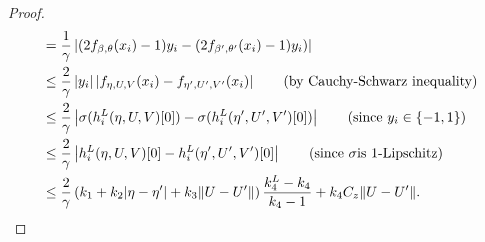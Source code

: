 \begin{proof}
\begin{align*}
        &= \frac{1}{\gamma}\left|(2f_{\beta, \theta}(x_i) - 1) y_i-(2f_{\beta^\prime, \theta^\prime}(x_i) - 1) y_i)\right|\\
        &\leq \frac{2}{\gamma}\left|y_i\right|\left|f_{\eta, U,V}(x_i) - f_{\eta^\prime, U^\prime,V^\prime}(x_i)\right|
        \tag{by Cauchy-Schwarz inequality}\\
        &\leq \frac{2}{\gamma}\left|\sigma(h_i^{L}(\eta, U, V)[0]) - \sigma(h_i^{L}(\eta^\prime, U^\prime, V^\prime)[0])\right|
        \tag{since $y_i \in \{-1,1\}$}\\
        &\leq \frac{2}{\gamma}\left|h_i^{L}(\eta, U, V)[0] - h_i^{L}(\eta^\prime, U^\prime, V^\prime)[0]\right| 
        \tag{since $\sigma$is $1$-Lipschitz}\\
        &\leq \frac{2}{\gamma} \left(k_1 + k_2|\eta-\eta^\prime| + k_3 \|U - U^{\prime}\|\right) \frac{k_4^L - k_4}{k_4 - 1} + k_4 C_z \|U - U^\prime\|.
    \end{align*}
\end{proof}

